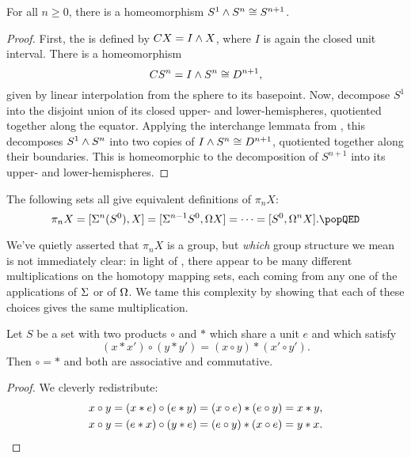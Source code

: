 \begin{lemma}
For all $n \ge 0$, there is a homeomorphism $S^1 \wedge S^n \cong S^{n+1}$.
\end{lemma}
\begin{proof}
First, the  is defined by $CX = I \wedge X$, where $I$ is again the closed unit interval.
There is a homeomorphism \[CS^n = I \wedge S^n \cong D^{n+1},\] given by linear interpolation from the sphere to its basepoint.
Now, decompose $S^1$ into the disjoint union of its closed upper- and lower-hemispheres, quotiented together along the equator.
Applying the interchange lemmata from , this decomposes $S^1 \wedge S^n$ into two copies of $I \wedge S^n \cong D^{n+1}$, quotiented together along their boundaries.
This is homeomorphic to the decomposition of $S^{n+1}$ into its upper- and lower-hemispheres.
\end{proof}

\begin{corollary}\label{EquivalentDefnsOfPiN}\pushQED{\qed}
The following sets all give equivalent definitions of $\pi_n X$: \[\pi_n X = [\Susp^n(S^0), X] = [\Susp^{n-1} S^0, \Loops X] = \cdots = [S^0, \Loops^n X]. \qedhere \popQED\]
\end{corollary}

We've quietly asserted that $\pi_n X$ is a group, but \emph{which} group structure we mean is not immediately clear: in light of , there appear to be many different multiplications on the homotopy mapping sets, each coming from any one of the applications of $\Sigma$ or of $\Omega$.
We tame this complexity by showing that each of these choices gives the same multiplication.

\begin{lemma}\label{EckmannHilton}%
Let $S$ be a set with two products $\circ$ and $*$ which share a unit $e$ and which satisfy \[(x * x') \circ (y * y') = (x \circ y) * (x' \circ y').\]  Then $\circ = *$ and both are associative and commutative.
\end{lemma}
\begin{proof}
We cleverly redistribute:
\begin{align*}
x \circ y & = (x * e) \circ (e * y) = (x \circ e) * (e \circ y) = x * y, \\
x \circ y & = (e * x) \circ (y * e) = (e \circ y) * (x \circ e) = y * x. \qedhere
\end{align*}
\end{proof}

